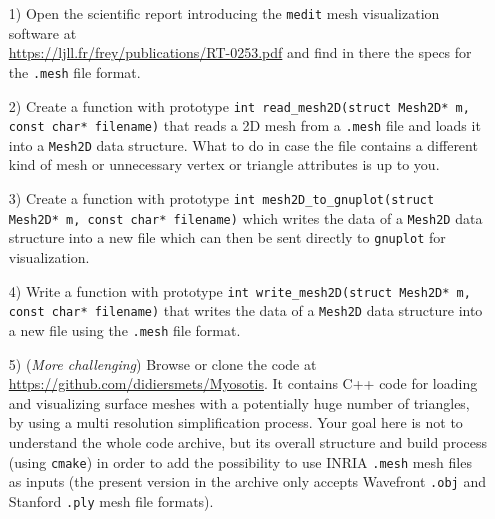 \documentclass[a4paper,12pt]{article}
\begin{document}
\begin{itemize}
\item[1)]  Open the scientific report introducing the {\tt medit} mesh visualization software at\\ 
\url{https://ljll.fr/frey/publications/RT-0253.pdf} and find in there the specs for the {\tt .mesh} file format.\\[-5pt]

\item[2)] Create a function with prototype \texttt{int read\_mesh2D(struct Mesh2D* m, const char* filename)}
  that reads a 2D mesh from a {\tt .mesh} file and loads it into a {\tt Mesh2D} data structure. What to do in case the file contains a different kind of mesh or unnecessary vertex or triangle attributes is up to you.\\[-5pt]

\item[3)] Create a function with prototype \texttt{int mesh2D\_to\_gnuplot(struct Mesh2D* m, const char* filename)} which writes the data of a {\tt Mesh2D} data structure into a new file which can then be sent directly to {\tt gnuplot} for visualization.\\[-5pt]
  
\item[4)] Write a function with prototype \texttt{int write\_mesh2D(struct Mesh2D* m, const char* filename)} that writes the data of a {\tt Mesh2D} data structure into a new file using the {\tt .mesh} file format.   

\item[5)] ({\it More challenging}) Browse or clone the code at
\url{https://github.com/didiersmets/Myosotis}. It contains C++ code for loading and visualizing surface meshes with a potentially huge number of triangles, by using a multi resolution simplification process. Your goal here is not to understand the whole code archive, but its overall structure and build process (using {\tt cmake}) in order to add the possibility to use INRIA {\tt .mesh} mesh files as inputs (the present version in the archive only accepts Wavefront {\tt .obj} and Stanford {\tt .ply} mesh file formats).  

\end{itemize}
\end{document}
